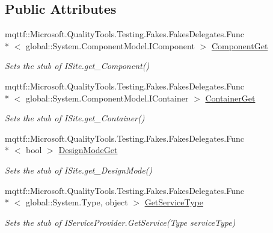 \subsection*{Public Attributes}
\begin{DoxyCompactItemize}
\item 
mqttf\-::\-Microsoft.\-Quality\-Tools.\-Testing.\-Fakes.\-Fakes\-Delegates.\-Func\\*
$<$ global\-::\-System.\-Component\-Model.\-I\-Component $>$ \hyperlink{class_system_1_1_component_model_1_1_fakes_1_1_stub_i_site_a80d15e023f5bb0fb8362e1bb5fd0ed7e}{Component\-Get}
\begin{DoxyCompactList}\small\item\em Sets the stub of I\-Site.\-get\-\_\-\-Component()\end{DoxyCompactList}\item 
mqttf\-::\-Microsoft.\-Quality\-Tools.\-Testing.\-Fakes.\-Fakes\-Delegates.\-Func\\*
$<$ global\-::\-System.\-Component\-Model.\-I\-Container $>$ \hyperlink{class_system_1_1_component_model_1_1_fakes_1_1_stub_i_site_af0d11cbd6a6b131afe1b093ade929ea2}{Container\-Get}
\begin{DoxyCompactList}\small\item\em Sets the stub of I\-Site.\-get\-\_\-\-Container()\end{DoxyCompactList}\item 
mqttf\-::\-Microsoft.\-Quality\-Tools.\-Testing.\-Fakes.\-Fakes\-Delegates.\-Func\\*
$<$ bool $>$ \hyperlink{class_system_1_1_component_model_1_1_fakes_1_1_stub_i_site_a8342b1e21c6143d6ca910c5ed9712fb3}{Design\-Mode\-Get}
\begin{DoxyCompactList}\small\item\em Sets the stub of I\-Site.\-get\-\_\-\-Design\-Mode()\end{DoxyCompactList}\item 
mqttf\-::\-Microsoft.\-Quality\-Tools.\-Testing.\-Fakes.\-Fakes\-Delegates.\-Func\\*
$<$ global\-::\-System.\-Type, object $>$ \hyperlink{class_system_1_1_component_model_1_1_fakes_1_1_stub_i_site_a862c1888cbf7134c25897772e9d3d78c}{Get\-Service\-Type}
\begin{DoxyCompactList}\small\item\em Sets the stub of I\-Service\-Provider.\-Get\-Service(\-Type service\-Type)\end{DoxyCompactList}\item 

\end{DoxyCompactItemize}
